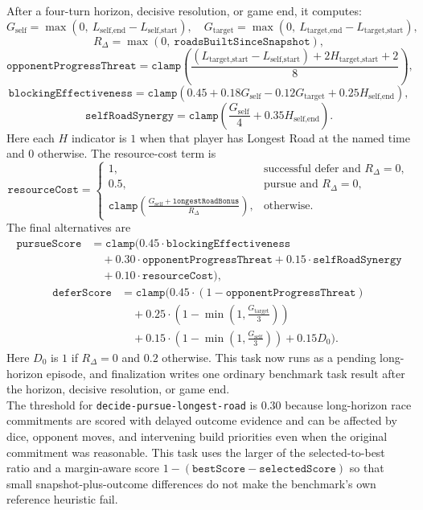 \documentclass{article}
\begin{document}
After a four-turn horizon, decisive resolution, or game end, it computes:
\[
G_{\text{self}} = \max(0,\ L_{\text{self,end}} - L_{\text{self,start}}),
\quad
G_{\text{target}} = \max(0,\ L_{\text{target,end}} - L_{\text{target,start}}),
\]
\[
R_{\Delta} = \max(0,\ \texttt{roadsBuiltSinceSnapshot}),
\]
\[
\texttt{opponentProgressThreat}
= \texttt{clamp}\left(
\frac{(L_{\text{target,start}} - L_{\text{self,start}}) + 2H_{\text{target,start}} + 2}{8}
\right),
\]
\[
\texttt{blockingEffectiveness}
= \texttt{clamp}(0.45 + 0.18G_{\text{self}} - 0.12G_{\text{target}} + 0.25H_{\text{self,end}}),
\]
\[
\texttt{selfRoadSynergy}
= \texttt{clamp}\left(\frac{G_{\text{self}}}{4} + 0.35H_{\text{self,end}}\right).
\]
Here each $H$ indicator is $1$ when that player has Longest Road at the named time and $0$ otherwise. The resource-cost term is
\[
\texttt{resourceCost} =
\begin{cases}
1, & \text{successful defer and } R_{\Delta}=0,\\
0.5, & \text{pursue and } R_{\Delta}=0,\\
\texttt{clamp}\left(\frac{G_{\text{self}} + \texttt{longestRoadBonus}}{R_{\Delta}}\right), & \text{otherwise}.
\end{cases}
\]
The final alternatives are
\[
\begin{aligned}
\texttt{pursueScore}
&= \texttt{clamp}(
0.45 \cdot \texttt{blockingEffectiveness} \\
&\quad + 0.30 \cdot \texttt{opponentProgressThreat}
+ 0.15 \cdot \texttt{selfRoadSynergy} \\
&\quad
+ 0.10 \cdot \texttt{resourceCost}),
\end{aligned}
\]
\[
\begin{aligned}
\texttt{deferScore}
&= \texttt{clamp}\bigl(
0.45 \cdot (1 - \texttt{opponentProgressThreat}) \\
&\quad + 0.25 \cdot \left(1 - \min\left(1,\frac{G_{\text{target}}}{3}\right)\right) \\
&\quad + 0.15 \cdot \left(1 - \min\left(1,\frac{G_{\text{self}}}{3}\right)\right)
+ 0.15D_0\bigr).
\end{aligned}
\]
Here $D_0$ is $1$ if $R_{\Delta}=0$ and $0.2$ otherwise.
This task now runs as a pending long-horizon episode, and finalization writes one ordinary benchmark task result after the horizon, decisive resolution, or game end.
\\
The threshold for \texttt{decide-pursue-longest-road} is $0.30$ because long-horizon race commitments are scored with delayed outcome evidence and can be affected by dice, opponent moves, and intervening build priorities even when the original commitment was reasonable. This task uses the larger of the selected-to-best ratio and a margin-aware score $1-(\texttt{bestScore}-\texttt{selectedScore})$ so that small snapshot-plus-outcome differences do not make the benchmark's own reference heuristic fail.
\end{document}
